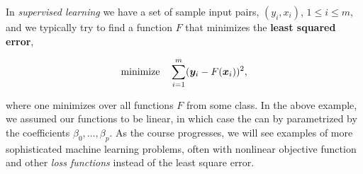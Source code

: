In {\em supervised learning} we have a set of sample input pairs, $(y_i,x_i)$, $1\leq i\leq m$, and we typically try to find a function $F$ that minimizes the \textbf{least squared error},

\begin{equation*}
  \text{minimize}\quad \sum_{i=1}^m (\bm{y}_i-F(\bm{x}_i))^2,
\end{equation*}

where one minimizes over all functions $F$ from some class. In the above example, we assumed our functions to be linear, in which case the can by parametrized by the coefficients $\beta_0, \dots,\beta_p$. As the course progresses, we will see examples of more sophisticated machine learning problems, often with nonlinear objective function and other {\em loss functions} instead of the least square error. 

